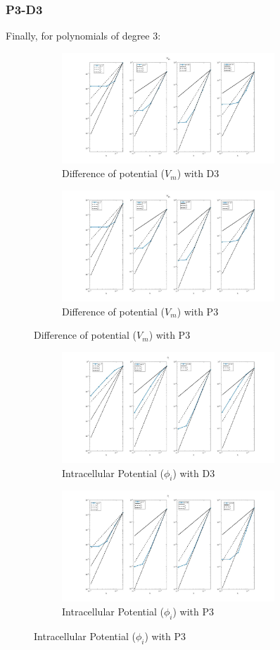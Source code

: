 \documentclass[a4paper,11pt]{article}
\begin{document}
\subsubsection{P3-D3}
Finally, for polynomials of degree 3: 
\begin{figure}[h]
\begin{subfigure}{0.5\textwidth}
\includegraphics[width = 8cm]{./D3_Vm_1.jpg}
\caption*{Difference of potential ($V_m$) with D3}
\label{Vm_D3}
\end{subfigure}
\begin{subfigure}{0.5\textwidth}
\includegraphics[width =8cm]{./P3_Vm_1.jpg}
\caption*{Difference of potential ($V_m$) with P3}
\label{Vm_P3}
\end{subfigure}
\end{figure}
\begin{figure}[h]
\begin{subfigure}{0.5\textwidth}
\includegraphics[width = 8cm]{./D3_Phii_1.jpg}
\caption*{Intracellular Potential ($\phi_i$) with D3}
\label{Phii_D3}
\end{subfigure}
\begin{subfigure}{0.5\textwidth}
\includegraphics[width =8cm]{./P3_Phii_1.jpg}
\caption*{Intracellular Potential ($\phi_i$) with P3}
\label{Phii_P3}
\end{subfigure}
\end{figure}
\end{document}
